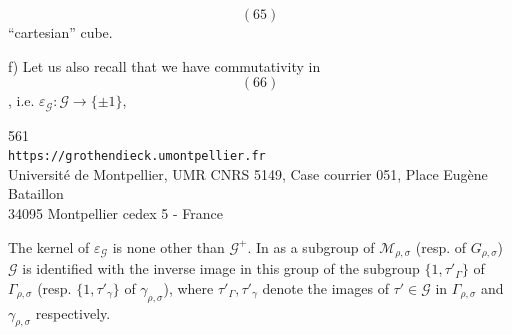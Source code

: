 \[
(65)
\]
``cartesian'' cube.

f) Let us also recall that we have commutativity in
\[
(66)
\]
, i.e. \(\varepsilon_{\mathcal G}:\mathcal G\longrightarrow\{\pm1\}\),


{\small
\begin{center}
561\\
\texttt{https://grothendieck.umontpellier.fr}\\
Université de Montpellier, UMR CNRS 5149, Case courrier 051, Place Eugène Bataillon\\
34095 Montpellier cedex 5 - France
\end{center}
}


The kernel of $\varepsilon_{\mathcal{G}}$ is none other than $\mathcal{G}^{+}$. In  as a subgroup of $\mathcal M_{\rho,\sigma}$ (resp. of $G_{\rho,\sigma}$) $\mathcal{G}$ is identified with the inverse image in this group of the subgroup $\{1,\tau'_{\Gamma}\}$ of $\Gamma_{\rho,\sigma}$ (resp.  $\{1,\tau'_{\gamma}\}$ of $\gamma_{\rho,\sigma}$), where $\tau'_{\Gamma},\tau'_{\gamma}$ denote the images of $\tau'\in\mathcal{G}$ in $\Gamma_{\rho,\sigma}$ and $\gamma_{\rho,\sigma}$ respectively.

